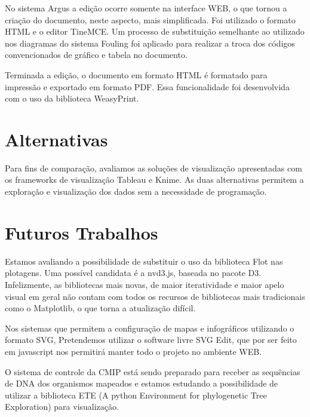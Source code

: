 \documentclass[]{article}
\begin{document}
No sistema Argus a edição ocorre somente na interface WEB, o que tornou a criação do documento, neste aspecto, mais simplificada. Foi utilizado o formato HTML e o editor TineMCE. Um processo de substituição semelhante ao utilizado nos diagramas do sistema Fouling foi aplicado para realizar a troca dos códigos convencionados de gráfico e tabela no documento.

Terminada a edição, o documento em formato HTML é formatado para impressão e exportado em formato PDF. Essa funcionalidade foi desenvolvida com o uso da biblioteca WeasyPrint.

\section{Alternativas}

Para fins de comparação, avaliamos as soluções de visualização apresentadas com os frameworks de visualização Tableau e Knime. As duas alternativas permitem a exploração e visualização dos dados sem a necessidade de programação. 


\section{Futuros Trabalhos}

Estamos avaliando a possibilidade de substituir o uso da biblioteca Flot nas plotagens. Uma possível candidata é a nvd3.js, baseada no pacote D3. Infelizmente, as bibliotecas mais novas, de maior iteratividade e maior apelo visual em geral não contam com todos os recursos de bibliotecas mais tradicionais como o Matplotlib, o que torna a atualização difícil.

Nos sistemas que permitem a configuração de mapas e infográficos utilizando o formato SVG, Pretendemos utilizar o software livre SVG Edit, que por ser feito em javascript nos permitirá manter todo o projeto no ambiente WEB.

O sistema de controle da CMIP está sendo preparado para receber as sequências de DNA dos organismos mapeados e estamos estudando a possibilidade de utilizar a biblioteca ETE (A python Environment for phylogenetic Tree Exploration) para visualização. 



\end{document}
